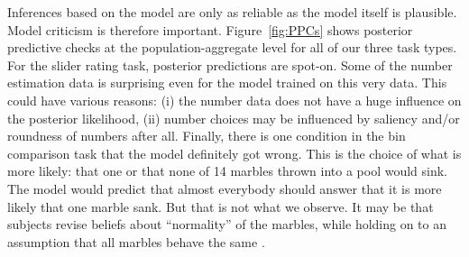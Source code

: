 \documentclass[10pt,letterpaper]{article}
\begin{document}
Inferences based on the model are only as reliable as the model itself is plausible. Model
criticism is therefore important. Figure~\ref{fig:PPCs} shows posterior predictive checks at
the population-aggregate level for all of our three task types. For the slider rating task,
posterior predictions are spot-on. Some of the number estimation data is surprising even for
the model trained on this very data. This could have various reasons: (i) the number data does
not have a huge influence on the posterior likelihood, (ii) number choices may be influenced by
saliency and/or roundness of numbers after all. Finally, there is one condition in the bin
comparison task that the model definitely got wrong. This is the choice of what is more likely:
that one or that none of 14 marbles thrown into a pool would sink. The model would predict that
almost everybody should answer that it is more likely that one marble sank. But that is not
what we observe. It may be that subjects revise beliefs about ``normality'' of the marbles,
while holding on to an assumption that all marbles behave the same
\cite{DegenTessler2015:Wonky-worlds:-L}.
\end{document}
